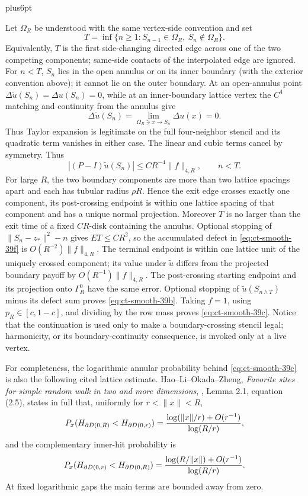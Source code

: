 \documentclass[12pt,reqno]{amsart}
\makeatletter
\theoremstyle{plain}
\theoremstyle{definition}
\theoremstyle{remark}
\renewenvironment{proof}[1][\proofname]{%
  \par
  \pushQED{\qed}%
  \normalfont
  \topsep6pt plus6pt\relax
  \trivlist
  \item[\hskip\labelsep\slshape #1\@addpunct{.}]%
  \ignorespaces
}{%
  \popQED
  \endtrivlist
  \@endpefalse
}
\DeclareRobustCommand{\qed}{%
  \leavevmode\unskip\penalty9999\hbox{}\nobreak
  \ifmmode
    \makebox[0pt][l]{\qquad\hbox{\qedsymbol}}%
  \else
    \qquad\hbox{\qedsymbol}%
  \fi
}
\renewcommand{\qedsymbol}{\rule[.47pt]{4pt}{6pt}}
\numberwithin{equation}{section}
\makeatother
\begin{document}
\begin{proof}[Proof of Lemma~\ref{lem:smooth-interface-discretization}]
Let $\Omega_R$ be understood with the same vertex-side convention and set
\[
T=\inf\{n\ge1:S_{n-1}\in\Omega_R,\ S_n\notin\Omega_R\}.
\]
Equivalently, $T$ is the first side-changing directed edge across one of
the two competing components; same-side contacts of the interpolated edge
are ignored.  For $n<T$, $S_n$ lies in the open annulus or on its inner
boundary (with the exterior convention above); it cannot lie on the outer
boundary.  At an open-annulus point
$\Delta\widetilde u(S_n)=\Delta u(S_n)=0$, while at an inner-boundary
lattice vertex the $C^4$ matching and continuity from the annulus give
\[
\Delta\widetilde u(S_n)
       =\lim_{\Omega_R\ni x\to S_n}\Delta u(x)=0.
\]
Thus Taylor expansion is legitimate on the full four-neighbor stencil and
its quadratic term vanishes in either case.  The linear and cubic terms
cancel by symmetry.
Thus
\begin{equation}
|(P-I)\widetilde u(S_n)|\le CR^{-4}\|f\|_{4,R},
             \qquad n<T.\label{eq:ct-smooth-39f}
\end{equation}
For large $R$, the two boundary components are more than two lattice
spacings apart and each has tubular radius $\rho R$.  Hence the exit edge
crosses exactly one component, its post-crossing endpoint is within one
lattice spacing of that component and has a unique normal projection.
Moreover $T$ is no larger than the exit time of a fixed $CR$-disk
containing the annulus.  Optional stopping of
$\lVert S_n-z_*\rVert^2-n$ gives $ET\le CR^2$, so the accumulated
defect in \eqref{eq:ct-smooth-39f} is $O(R^{-2})\|f\|_{4,R}$.  The terminal endpoint is
within one lattice unit of the uniquely crossed component; its value
under $\widetilde u$ differs from the projected boundary payoff by
$O(R^{-1})\|f\|_{4,R}$.  The post-crossing starting endpoint and its
projection onto $\Gamma_R^0$ have the same error.  Optional stopping of
$\widetilde u(S_{n\wedge T})$ minus its defect sum proves \eqref{eq:ct-smooth-39b}.
Taking $f=1$, using $p_R\in[c,1-c]$, and dividing by the row mass
proves \eqref{eq:ct-smooth-39c}.  Notice that the continuation is used only to make a
boundary-crossing stencil legal; harmonicity, or its boundary-continuity
consequence, is invoked only at a live vertex.

For completeness, the logarithmic annular probability behind \eqref{eq:ct-smooth-39c} is
also the following cited lattice estimate.  Hao--Li--Okada--Zheng,
\emph{Favorite sites for simple random walk in two and more dimensions},
\cite{HLOZ2025}, Lemma 2.1,
equation (2.5), states in full that, uniformly for
$r<\lVert x\rVert<R$,
\[
P_x(H_{\partial D(0,R)}<H_{\partial D(0,r)})
 ={\log(\lVert x\rVert/r)+O(r^{-1})\over\log(R/r)},
\]
and the complementary inner-hit probability is
\[
P_x(H_{\partial D(0,r)}<H_{\partial D(0,R)})
 ={\log(R/\lVert x\rVert)+O(r^{-1})\over\log(R/r)}.
\]
At fixed logarithmic gaps the main terms are bounded away from zero.


\end{proof}
\end{document}
